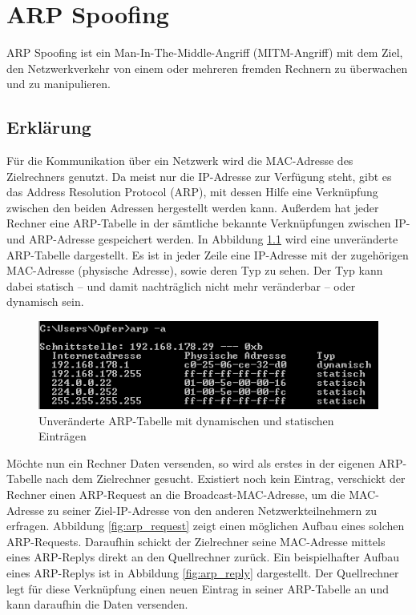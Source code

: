 \chapter{ARP Spoofing}
\label{chapter_arp_spoofing}
ARP Spoofing ist ein Man-In-The-Middle-Angriff (MITM-Angriff) mit dem Ziel, den Netzwerkverkehr von einem oder mehreren fremden Rechnern zu überwachen und zu manipulieren.

\section{Erklärung}
Für die Kommunikation über ein Netzwerk wird die MAC-Adresse des Zielrechners genutzt. Da meist nur die IP-Adresse zur Verfügung steht, gibt es das Address Resolution Protocol (ARP), mit dessen Hilfe eine Verknüpfung zwischen den beiden Adressen hergestellt werden kann. Außerdem hat jeder Rechner eine ARP-Tabelle in der sämtliche bekannte Verknüpfungen zwischen IP- und ARP-Adresse gespeichert werden. In Abbildung \ref{fig:arp_tabelle_vorher} wird eine unveränderte ARP-Tabelle dargestellt. Es ist in jeder Zeile eine IP-Adresse mit der zugehörigen MAC-Adresse (physische Adresse), sowie deren Typ zu sehen. Der Typ kann dabei statisch -- und damit nachträglich nicht mehr veränderbar -- oder dynamisch sein.

\begin{figure}
	\centering
	\includegraphics[width=\textwidth]{images/arp/ARP_Tabelle_Vorher}
	\caption{Unveränderte ARP-Tabelle mit dynamischen und statischen Einträgen}
	\label{fig:arp_tabelle_vorher}
\end{figure}

Möchte nun ein Rechner Daten versenden, so wird als erstes in der eigenen ARP-Tabelle nach dem Zielrechner gesucht. Existiert noch kein Eintrag, verschickt der Rechner einen ARP-Request an die Broadcast-MAC-Adresse, um die MAC-Adresse zu seiner Ziel-IP-Adresse von den anderen Netzwerkteilnehmern zu erfragen. Abbildung \ref{fig:arp_request} zeigt einen möglichen Aufbau eines solchen ARP-Requests. Daraufhin schickt der Zielrechner seine MAC-Adresse mittels eines ARP-Replys direkt an den Quellrechner zurück. Ein beispielhafter Aufbau eines ARP-Replys ist in Abbildung \ref{fig:arp_reply} dargestellt. Der Quellrechner legt für diese Verknüpfung einen neuen Eintrag in seiner ARP-Tabelle an und kann daraufhin die Daten versenden.

